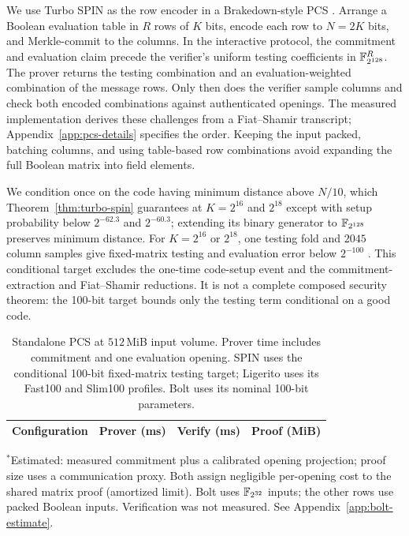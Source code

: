 We use Turbo SPIN as the row encoder in a Brakedown-style PCS
\cite{brakedown23}. Arrange a Boolean evaluation table in $R$ rows of
$K$ bits, encode each row to $N=2K$ bits, and Merkle-commit to the columns.
In the interactive protocol, the commitment and evaluation claim precede
the verifier's uniform testing coefficients in $\mathbb F_{2^{128}}^R$.
The prover returns the testing combination and an evaluation-weighted
combination of the message rows. Only then does the verifier sample
columns and check both encoded combinations against authenticated openings.
The measured implementation derives these challenges from a Fiat--Shamir
transcript; Appendix~\ref{app:pcs-details} specifies the order.
Keeping the input packed, batching columns, and using table-based row
combinations avoid expanding the full Boolean matrix into field elements.

We condition once on the code having minimum distance above $N/10$, which
Theorem~\ref{thm:turbo-spin} guarantees at $K=2^{16}$ and $2^{18}$ except with
setup probability below $2^{-62.3}$ and $2^{-60.3}$; extending its binary
generator to $\mathbb F_{2^{128}}$ preserves minimum distance.
For $K=2^{16}$ or $2^{18}$, one testing fold and $2045$ column samples give
fixed-matrix testing and evaluation error below $2^{-100}$
\cite{diamondPosen24}. This conditional target excludes the one-time
code-setup event and the commitment-extraction and Fiat--Shamir reductions.
It is not a complete composed security theorem: the 100-bit target
bounds only the testing term conditional on a good code.

\begin{table}[!htbp]
\centering
\caption{Standalone PCS at $512$\,MiB input volume. Prover time includes
commitment and one evaluation opening. SPIN uses the conditional 100-bit
fixed-matrix testing target; Ligerito uses its Fast100 and Slim100 profiles. Bolt uses its
nominal 100-bit parameters.}
\label{tab:spin-pcs-standalone}
\small
\begin{tabular}{@{}lrrr@{}}
\toprule
Configuration & Prover (ms) & Verify (ms) & Proof (MiB) \\
\midrule

\end{tabular}
\par\smallskip
\begin{minipage}{\linewidth}\footnotesize
$^{*}$Estimated: measured commitment plus a calibrated opening projection;
proof size uses a communication proxy. Both assign negligible per-opening
cost to the shared matrix proof (amortized limit). Bolt uses
$\mathbb F_{2^{32}}$ inputs; the other rows use packed Boolean inputs.
Verification was not measured. See Appendix~\ref{app:bolt-estimate}.
\end{minipage}
\end{table}

